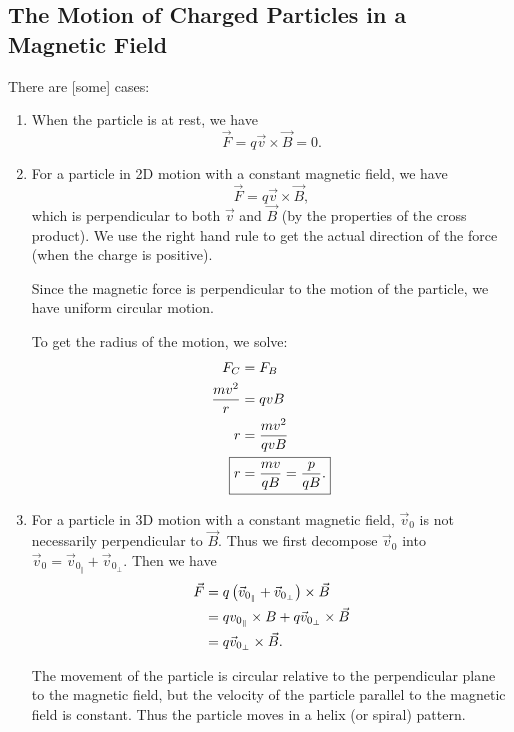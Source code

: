\documentclass[class=article, crop=false]{standalone}
\begin{document}
  \subsection{The Motion of Charged Particles in a Magnetic Field}
  There are [some] cases:
  \begin{enumerate}[label=\roman*)]
    \item When the particle is at rest, we have
    \[
      \vec{F} = q\vec{v}\times \vec{B} = 0.
    \]
    \item For a particle in 2D motion with a constant magnetic field, we have
    \[
      \vec{F} = q\vec{v}\times \vec{B},
    \]
    which is perpendicular to both $\vec{v}$ and $\vec{B}$ (by the properties of the cross product). We use the right hand rule to get the actual direction of the force (when the charge is positive).
    \begin{note}{}
      Since the magnetic force is perpendicular to the motion of the particle, we have uniform circular motion.
    \end{note}
    To get the radius of the motion, we solve:
    \begin{align*}
      F_C &= F_B \\
      \frac{mv^2}{r} &= qvB \\
      r &= \frac{mv^2}{qvB} \\
      \Aboxed{r &= \frac{mv}{qB} = \frac{p}{qB}.}
    \end{align*}
    \item For a particle in 3D motion with a constant magnetic field, $\vec{v}_0$ is not necessarily perpendicular to $\vec{B}$. Thus we first decompose $\vec{v}_0$ into $\vec{v}_0 = \vec{v}_{0_\Vert} + \vec{v}_{0_\perp}$. Then we have
    \begin{align*}
      \vec{F} &= q\left( \vec{v}_{0_\Vert} + \vec{v}_{0_\perp} \right)\times \vec{B} \\
              &= qv_{0_\Vert}\times B + q\vec{v}_{0_\perp}\times \vec{B} \\
              &= q\vec{v}_{0_\perp}\times \vec{B}.
    \end{align*}
    \begin{note}{}
      The movement of the particle is circular relative to the perpendicular plane to the magnetic field, but the velocity of the particle parallel to the magnetic field is constant. Thus the particle moves in a helix (or spiral) pattern.
    \end{note}
  \end{enumerate}
\end{document}
